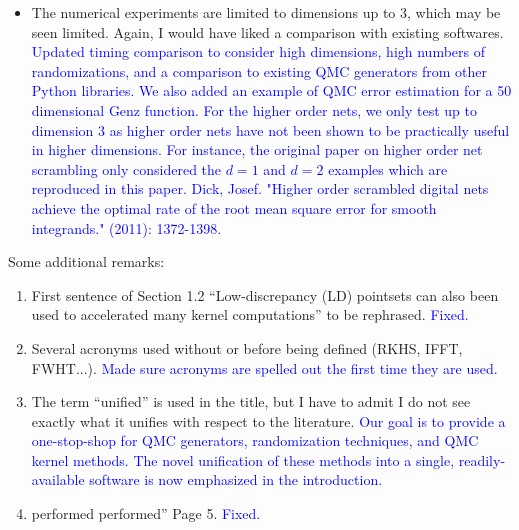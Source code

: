 \documentclass{article}
\newcommand{\response}[1]{{\newline \textcolor{blue}{#1}}}
\newcommand{\fixed}{\response{Fixed.}}
\begin{document}
\begin{itemize}
    \response{Added context / motivation to the introduction and significantly rewrote large portions of the text to improve readility.} 
    \item The numerical experiments are limited to dimensions up to 3, which may be seen limited. Again, I would have liked a comparison with existing softwares.
    \response{Updated timing comparison to consider high dimensions, high numbers of randomizations, and a comparison to existing QMC generators from other Python libraries. We also added an example of QMC error estimation for a 50 dimensional Genz function. For the higher order nets, we only test up to dimension 3 as higher order nets have not been shown to be practically useful in higher dimensions. For instance, the original paper on higher order net scrambling only considered the $d=1$ and $d=2$ examples which are reproduced in this paper. \newline 
    Dick, Josef. "Higher order scrambled digital nets achieve the optimal rate of the root mean square error for smooth integrands." (2011): 1372-1398.
    }
\end{itemize} 

Some additional remarks:

\begin{enumerate} 
    \item First sentence of Section 1.2 “Low-discrepancy (LD) pointsets can also been used to accelerated many kernel computations” to be rephrased.
    \fixed
    \item Several acronyms used without or before being defined (RKHS, IFFT, FWHT...).
    \response{Made sure acronyms are spelled out the first time they are used.}
    \item The term ``unified'' is used in the title, but I have to admit I do not see exactly what it unifies with respect to the literature.
    \response{Our goal is to provide a one-stop-shop for QMC generators, randomization techniques, and QMC kernel methods. The novel unification of these methods into a single, readily-available software is now emphasized in the introduction.}
    \item performed performed” Page 5.
    \fixed
\end{enumerate}
\end{document}
